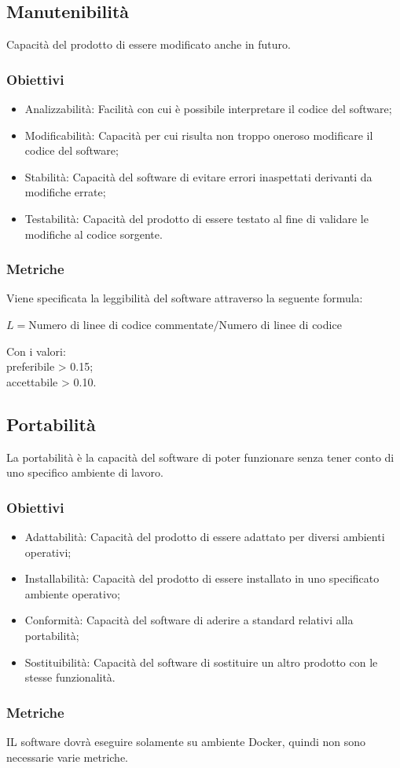 \subsection{Manutenibilità}
Capacità del prodotto di essere modificato anche in futuro.
\subsubsection{Obiettivi}
\begin{itemize}
	\item Analizzabilità: Facilità con cui è possibile interpretare il codice del software;
	\item Modificabilità: Capacità per cui risulta non troppo oneroso modificare il codice del software;
	\item Stabilità: Capacità del software di evitare errori inaspettati derivanti da modifiche errate;
	\item Testabilità: Capacità del prodotto di essere testato al fine di validare le modifiche al codice sorgente.
\end{itemize}
\subsubsection{Metriche}
Viene specificata la leggibilità del software attraverso la seguente formula:
\begin{center}
	$L = $Numero di linee di codice commentate$ / $Numero di linee di codice
\end{center}
Con i valori:\\
preferibile > 0.15;\\
accettabile > 0.10.

\subsection{Portabilità}
La portabilità è la capacità del software di poter funzionare senza tener conto di uno specifico ambiente di lavoro.
\subsubsection{Obiettivi}
\begin{itemize}
	\item Adattabilità: Capacità del prodotto di essere adattato per diversi ambienti operativi;
	\item Installabilità: Capacità del prodotto di essere installato in uno specificato ambiente operativo;
	\item Conformità: Capacità del software di aderire a standard relativi alla portabilità;
	\item Sostituibilità: Capacità del software di sostituire un altro prodotto con le stesse funzionalità.
\end{itemize}
\subsubsection{Metriche}
IL software dovrà eseguire solamente su ambiente Docker, quindi non sono necessarie varie metriche.
